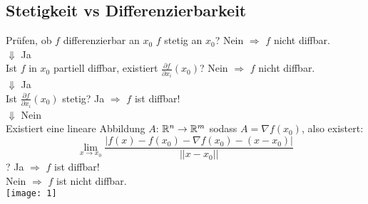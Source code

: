 \subsection{Stetigkeit vs Differenzierbarkeit}


\begin{Rezept}{Prüfen, ob $f$ differenzierbar an $x_0$}{}
	$f$ stetig an $x_0$? Nein $\Rightarrow$ $f$ nicht diffbar.\\
	$\Downarrow$ Ja\\
	Ist $f$ in $x_0$ partiell diffbar, existiert $\frac{\partial f}{\partial x_i}(x_0)$? Nein $\Rightarrow$ $f$ nicht diffbar.\\
	$\Downarrow$ Ja\\
	Ist $\frac{\partial f}{\partial x_i}(x_0)$ stetig? Ja $\Rightarrow$ $f$ ist diffbar!\\
	$\Downarrow$ Nein\\
	Existiert eine lineare Abbildung $A$: $\mathbb{R}^n \rightarrow \mathbb{R}^m$ sodass $A=\nabla f(x_0)$, also existert:
	\[
    	\lim_{x\rightarrow x_0} \frac{|f(x)-f(x_0)-\nabla f(x_0) - (x-x_0)|}{||x-x_0||}
	\]?
	Ja $\Rightarrow$ $f$ ist diffbar!\\
	Nein $\Rightarrow$ $f$ ist nicht diffbar.\\
	\texttt{[image: 1]}
\end{Rezept}

